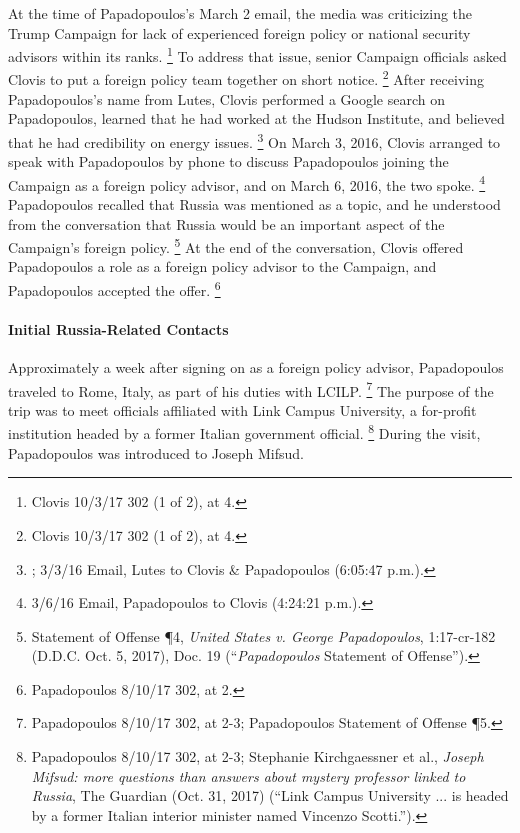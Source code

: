 At the time of Papadopoulos's March 2 email, the media was criticizing the Trump Campaign for lack of experienced foreign policy or national security advisors within its ranks.%
\footnote{Clovis 10/3/17 302 (1 of 2), at 4.}
To address that issue, senior Campaign officials asked Clovis to put a foreign policy team together on short notice.%
\footnote{Clovis 10/3/17 302 (1 of 2), at 4.}
After receiving Papadopoulos's name from Lutes, Clovis performed a Google search on Papadopoulos, learned that he had worked at the Hudson Institute, and believed that he had credibility on energy issues.%
\footnote{; 3/3/16 Email, Lutes to Clovis \& Papadopoulos (6:05:47 p.m.).}
On March 3, 2016, Clovis arranged to speak with Papadopoulos by phone to discuss Papadopoulos joining the Campaign as a foreign policy advisor, and on March 6, 2016, the two spoke.%
\footnote{3/6/16 Email, Papadopoulos to Clovis (4:24:21 p.m.).}
Papadopoulos recalled that Russia was mentioned as a topic, and he understood from the conversation that Russia would be an important aspect of the Campaign's foreign policy.%
\footnote{Statement of Offense \P 4, \textit{United States v. George Papadopoulos}, 1:17-cr-182 (D.D.C. Oct. 5,
2017), Doc. 19 (“\textit{Papadopoulos} Statement of Offense”).}
At the end of the conversation, Clovis offered Papadopoulos a role as a foreign policy advisor to the Campaign, and Papadopoulos accepted the offer.%
\footnote{Papadopoulos 8/10/17 302, at 2.}

\paragraph{Initial Russia-Related Contacts}

Approximately a week after signing on as a foreign policy advisor, Papadopoulos traveled to Rome, Italy, as part of his duties with LCILP.%
\footnote{Papadopoulos 8/10/17 302, at 2-3; Papadopoulos Statement of Offense \P 5.}
The purpose of the trip was to meet officials affiliated with Link Campus University, a for-profit institution headed by a former Italian government official.%
\footnote{Papadopoulos 8/10/17 302, at 2-3;
Stephanie Kirchgaessner et al., \textit{Joseph Mifsud: more questions than answers about mystery professor linked to Russia}, The Guardian (Oct. 31, 2017) (“Link Campus University ... is headed by a former Italian interior minister named Vincenzo Scotti.”).}
During the visit, Papadopoulos was introduced to Joseph Mifsud.

